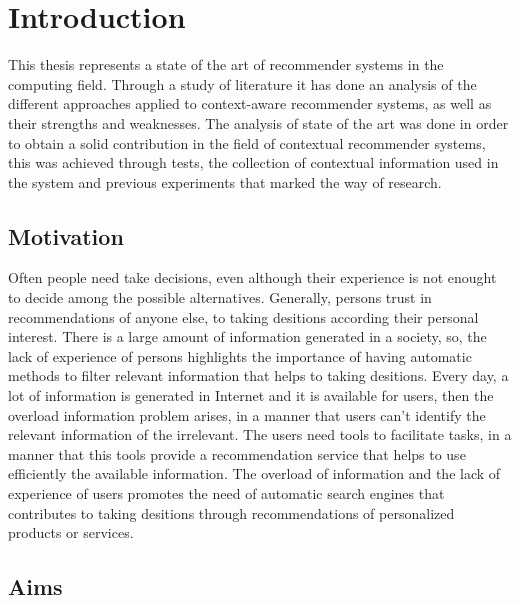 \chapter{Introduction} \label{introduction} 

This thesis represents a state of the art of recommender systems in
the computing field. Through a study of literature it has done an
analysis of the different approaches applied to context-aware
recommender systems, as well as their strengths and weaknesses.  
The analysis of state of the art was done in order to obtain a solid
contribution in the field of contextual recommender systems, this was
achieved through tests, the collection of contextual information used
in the system and previous experiments that marked the way of
research.

\section{Motivation}

Often people need take decisions, even although their experience is
not enought to decide among the possible alternatives. Generally,
persons trust in recommendations of anyone else, to taking desitions
according their personal interest. There is a large amount of
information generated in a society, so, the lack of experience of
persons highlights the importance of having automatic methods to
filter relevant information that helps to taking desitions. Every day,
a lot of information is generated in Internet and it is available for
users, then the overload information problem arises, in a manner that
users can't identify the relevant information of the irrelevant. The
users need tools to facilitate tasks, in a manner that this tools
provide a recommendation service that helps to use efficiently the
available information. The overload of information and the lack of
experience of users promotes the need of automatic search engines
that contributes to taking desitions through recommendations of
personalized products or services.

\section{Aims}

